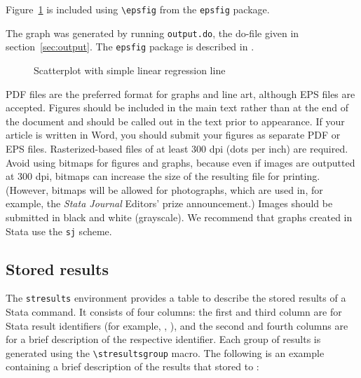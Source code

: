Figure~\ref{fig} is included using \verb+\epsfig+ from the \texttt{epsfig}
package.  

\noindent
The graph was generated by running \texttt{output.do}, the
do-file given in section~\ref{sec:output}.  The \texttt{epsfig} package is
described in \citet*{latexcompanion}.

\clearpage

\begin{figure}[h!]
\begin{center}
\end{center}
\caption{Scatterplot with simple linear regression line}
\label{fig}
\end{figure}

{\smrm PDF} files are the preferred format for graphs and line art, although
{\smrm EPS} files are accepted. Figures should be included in the main text
rather than at the end of the document and should be called out in the text
prior to appearance. If your article is written in Word, you should submit
your figures as separate {\smrm PDF} or {\smrm EPS} files.  Rasterized-based
files of at least 300 dpi (dots per inch) are required.  Avoid using bitmaps
for figures and graphs, because even if images are outputted at 300 dpi,
bitmaps can increase the size of the resulting file for printing. (However,
bitmaps will be allowed for photographs, which are used in, for example, the
{\sl Stata Journal} Editors' prize announcement.) Images should be submitted
in black and white (grayscale). We recommend that graphs created in Stata use
the {\tt sj} scheme.

\subsection{Stored results}

The \texttt{stresults} environment provides a table to describe the stored
results of a Stata command.  It consists of four columns: the first and third
column are for Stata result identifiers (for example, ,
), and the second and fourth columns are for a brief description
of the respective identifier.
%
Each group of results is generated using the \verb+\stresultsgroup+ macro.
%
The following is an example containing a brief description of the results that
 stored to :

\clearpage

